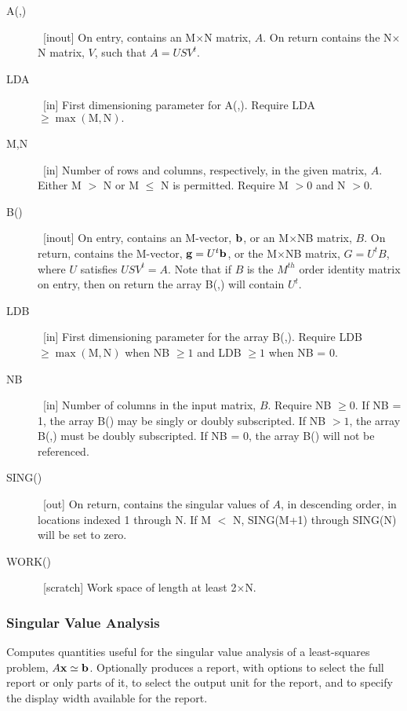 \documentclass[twoside]{MATH77}
\begin{document}
\begin{description}
\item[A(,)]  \ [inout] On entry, contains an M$\times $N matrix, $A$. On
return contains the N$\times $N matrix, $V$, such that $A=USV^t.$

\item[LDA]  \ [in] First dimensioning parameter for A(,). Require LDA $\geq
\max (\text{M},\text{N}).$

\item[M,N]  \ [in] Number of rows and columns, respectively, in the given
matrix, $A$. Either M $>$ N or M $\leq $ N is permitted. Require M $>0$ and
N $>0.$

\item[B()]  \ [inout] On entry, contains an M-vector, ${\bf b}$, or an M$%
\times $NB matrix, $B$. On return, contains the M-vector, ${\bf g}=U^t{\bf b}
$, or the M$\times $NB matrix, $G=U^tB$, where $U$ satisfies $USV^t=A.$ Note
that if $B$ is the $M^{th}$ order identity matrix on entry, then on return
the array B(,) will contain $U^t.$

\item[LDB]  \ [in] First dimensioning parameter for the array B(,). Require
LDB $\geq \max (\text{M},\text{N})$ when NB $\geq 1$ and LDB $\geq 1$ when
NB = 0.

\item[NB]  \ [in] Number of columns in the input matrix, $B$. Require NB $%
\geq 0$. If NB = 1, the array B() may be singly or doubly subscripted. If NB
$>1$, the array B(,) must be doubly subscripted. If NB = 0, the array B()
will not be referenced.

\item[SING()]  \ [out] On return, contains the singular values of $A$, in
descending order, in locations indexed 1 through N. If M $<$ N, SING(M+1)
through SING(N) will be set to zero.

\item[WORK()]  \ [scratch] Work space of length at least 2$\times $N.
\end{description}

\subsubsection{Singular Value Analysis}

Computes quantities useful for the singular value analysis of a
least-squares problem, $A{\bf x} \simeq {\bf b}$. Optionally produces a
report, with options to select the full report or only parts of it, to
select the output unit for the report, and to specify the display width
available for the report.
\end{document}
